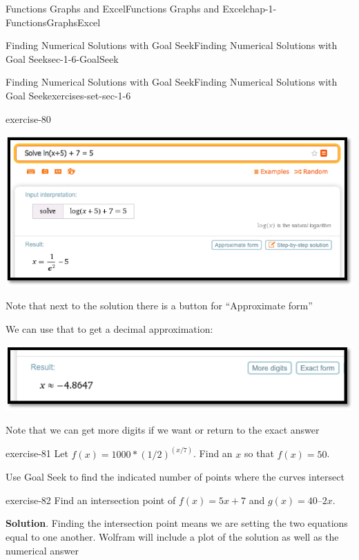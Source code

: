 \documentclass[oneside,10pt,]{book}
\numberwithin{equation}{section}
\begin{document}
\begin{chapterptx}{Functions Graphs and Excel}{}{Functions Graphs and Excel}{}{}{chap-1-FunctionsGraphsExcel}
\begin{sectionptx}{Finding Numerical Solutions with Goal Seek}{}{Finding Numerical Solutions with Goal Seek}{}{}{sec-1-6-GoalSeek}
\begin{exercises-subsection-numberless}{Finding Numerical Solutions with Goal Seek}{}{Finding Numerical Solutions with Goal Seek}{}{}{exercises-set-sec-1-6}
\begin{divisionexercise}{5}{}{}{exercise-80}
\begin{sidebyside}{1}{0}{0}{0}
\begin{sbspanel}{1}
\includegraphics[width=1\linewidth]{images/sec1-6-sol5a.png}
\end{sbspanel}%
\end{sidebyside}%
 Note that next to the solution there is a button for ``Approximate form''%
\par
\hypertarget{p-511}{}%
We can use that to get a decimal approximation: \leavevmode%
\begin{sidebyside}{1}{0}{0}{0}%
\begin{sbspanel}{1}%
\includegraphics[width=1\linewidth]{images/sec1-6-sol5b.png}
\end{sbspanel}%
\end{sidebyside}%
 Note that we can get more digits if we want or return to the exact answer%
\end{divisionexercise}%
\begin{divisionexercise}{6}{}{}{exercise-81}%
\hypertarget{p-512}{}%
Let \(f(x) = 1000*(1/2)^{(x/7)}\).  Find an \(x\) so that \(f(x) = 50\).%
\end{divisionexercise}%
\hypertarget{p-513}{}%
Use Goal Seek to find the indicated number of points where the curves intersect%
\begin{divisionexercise}{7}{}{}{exercise-82}%
\hypertarget{p-514}{}%
Find an intersection point of \(f(x) = 5 x + 7\) and \(g(x) = 40 – 2 x\).%
\par\smallskip%
\noindent\textbf{Solution}.\hypertarget{solution-39}{}\quad%
\hypertarget{p-515}{}%
Finding the intersection point means we are setting the two equations equal to one another. Wolfram will include a plot of the solution as well as the numerical answer \leavevmode%
\begin{sidebyside}{1}{0}{0}{0}%

\end{sidebyside}
\end{divisionexercise}
\end{exercises-subsection-numberless}
\end{sectionptx}
\end{chapterptx}
\end{document}

